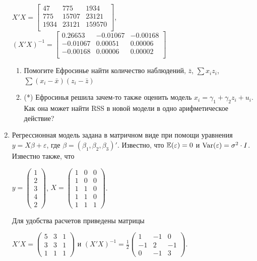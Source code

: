 \documentclass[12pt, a4paper]{article}\usepackage[]{graphicx}\usepackage[]{color}
\begin{document}
\begin{enumerate}
$X'X = \begin{bmatrix}{}
  47 & 775 & 1934 \\
  775 & 15707 & 23121 \\
  1934 & 23121 & 159570 \\
  \end{bmatrix}$,
$(X'X)^{-1}=\begin{bmatrix}{}
  0.26653 & -0.01067 & -0.00168 \\
  -0.01067 & 0.00051 & 0.00006 \\
  -0.00168 & 0.00006 & 0.00002 \\
  \end{bmatrix}$


\begin{enumerate}
\item Помогите Ефросинье найти количество наблюдений, $\bar{z}$, $\sum x_i z_i$, $\sum(x_i-\bar{x})(z_i-\bar{z})$
\item (*) Ефросинья решила зачем-то также оценить модель $x_i = \gamma_1 + \gamma_2 z_i + u_i$. Как она может найти RSS в новой модели в одно арифметическое действие?
\end{enumerate}

\item Регрессионная модель  задана в матричном виде при помощи уравнения $y=X\beta+\varepsilon$, где $\beta=(\beta_1,\beta_2,\beta_3)'$.
Известно, что $\mathbb{E}(\varepsilon)=0$  и  $\operatorname{Var}(\varepsilon)=\sigma^2\cdot I$.
Известно также, что

$y=\left(
\begin{array}{c}
1\\
2\\
3\\
4\\
2
\end{array}\right)$,
$X=\left(\begin{array}{ccc}
1 & 0 & 0 \\
1 & 0 & 0 \\
1 & 1 & 0 \\
1 & 1 & 0 \\
1 & 1 & 1
\end{array}\right)$.


Для удобства расчетов приведены матрицы


$X'X=\left(
\begin{array}{ccc}
5 & 3 & 1\\
3 & 3 & 1\\
1 & 1 & 1
\end{array}\right)$ и $(X'X)^{-1}=\frac{1}{2}\left(
\begin{array}{ccc}
1 & -1 & 0 \\
-1 & 2 & -1 \\
0 & -1 & 3
\end{array}\right)$.


\end{enumerate}
\end{document}
